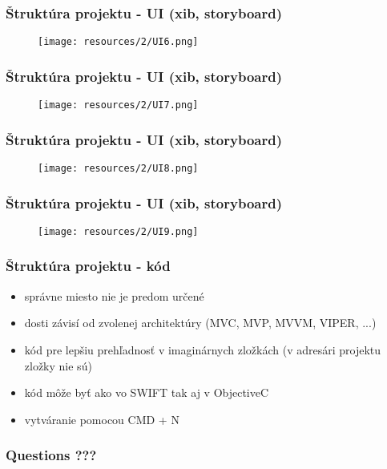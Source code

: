 \documentclass[serif,mathserif]{beamer}
\begin{document}
\begin{frame}
  \frametitle{Štruktúra projektu - UI (xib, storyboard)}
 \begin{figure}[h]
	\texttt{[image: resources/2/UI6.png]}
  \end{figure}
\end{frame}

\begin{frame}
  \frametitle{Štruktúra projektu - UI (xib, storyboard)}
 \begin{figure}[h]
	\texttt{[image: resources/2/UI7.png]}
  \end{figure}
\end{frame}

\begin{frame}
  \frametitle{Štruktúra projektu - UI (xib, storyboard)}
 \begin{figure}[h]
	\texttt{[image: resources/2/UI8.png]}
  \end{figure}
\end{frame}

\begin{frame}
  \frametitle{Štruktúra projektu - UI (xib, storyboard)}
 \begin{figure}[h]
	\texttt{[image: resources/2/UI9.png]}
  \end{figure}
\end{frame}

\begin{frame}
  \frametitle{Štruktúra projektu - kód}
  \begin{itemize}
  \item správne miesto nie je predom určené \pause
  \item dosti závisí od zvolenej architektúry (MVC, MVP, MVVM, VIPER, ...) \pause  
  \item kód pre lepšiu prehľadnosť v imaginárnych zložkách (v adresári projektu zložky nie sú) \pause
  \item kód môže byť ako vo SWIFT tak aj v ObjectiveC \pause  
  \item vytváranie pomocou CMD + N
  \end{itemize}
\end{frame}

\begin{frame}
  \frametitle{Questions ???}
\end{frame}
\end{document}
